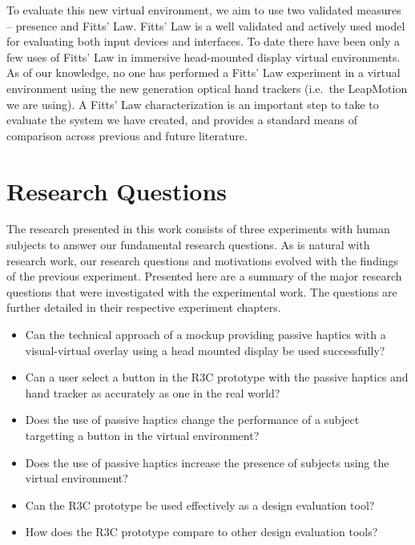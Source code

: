 To evaluate this new virtual environment, we aim to use two validated measures -- presence and Fitts' Law.
Fitts' Law is a well validated and actively used model for evaluating both input devices and interfaces.
To date there have been only a few uses of Fitts' Law in immersive head-mounted display virtual environments.
As of our knowledge, no one has performed a Fitts' Law experiment in a virtual environment using the new generation optical hand trackers (i.e.\ the LeapMotion we are using).
A Fitts' Law characterization is an important step to take to evaluate the system we have created, and provides a standard means of comparison across previous and future literature.


\section{Research Questions}
\label{hypotheses}

The research presented in this work consists of three experiments with human subjects to answer our fundamental research questions.
As is natural with research work, our research questions and motivations evolved with the findings of the previous experiment.
Presented here are a summary of the major research questions that were investigated with the experimental work.
The questions are further detailed in their respective experiment chapters.

\begin{itemize}
    \item Can the technical approach of a mockup providing passive haptics with a visual-virtual overlay using a head mounted display be used successfully?
    \item Can a user select a button in the R3C prototype with the passive haptics and hand tracker as accurately as one in the real world?
    \item Does the use of passive haptics change the performance of a subject targetting a button in the virtual environment?
    \item Does the use of passive haptics increase the presence of subjects using the virtual environment?
    \item Can the R3C prototype be used effectively as a design evaluation tool?
    \item How does the R3C prototype compare to other design evaluation tools?
\end{itemize}


